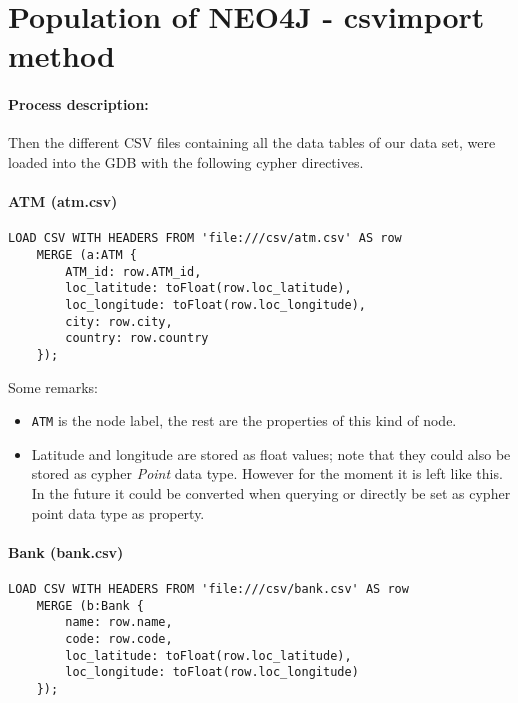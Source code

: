\section{Population of NEO4J - csvimport method}
{\color{gray}
\paragraph{Process description:}

Then the different CSV files containing all the data tables of our data set, were loaded into the GDB with the following cypher directives.

\paragraph{ATM (atm.csv)}

\begin{center}
\lstset{style=cypherStyle}
\begin{lstlisting}[caption={atm.csv}]
    LOAD CSV WITH HEADERS FROM 'file:///csv/atm.csv' AS row
    MERGE (a:ATM {
        ATM_id: row.ATM_id,
        loc_latitude: toFloat(row.loc_latitude),
        loc_longitude: toFloat(row.loc_longitude),
        city: row.city,
        country: row.country
    });
\end{lstlisting}
\end{center}

Some remarks:
\begin{itemize}
    \item \texttt{ATM} is the node label, the rest are the properties of this kind of node.
    \item Latitude and longitude are stored as float values; note that they could also be stored
    as cypher \textit{Point} data type. However for the moment it is left like this. In the future
    it could be converted when querying or directly be set as cypher point data type as property.
\end{itemize}

\paragraph{Bank (bank.csv)}

\begin{center}
\lstset{style=cypherStyle}
\begin{lstlisting}[caption={bank.csv}]
    LOAD CSV WITH HEADERS FROM 'file:///csv/bank.csv' AS row
    MERGE (b:Bank {
        name: row.name, 
        code: row.code, 
        loc_latitude: toFloat(row.loc_latitude), 
        loc_longitude: toFloat(row.loc_longitude)
    });
\end{lstlisting}
\end{center}

}
